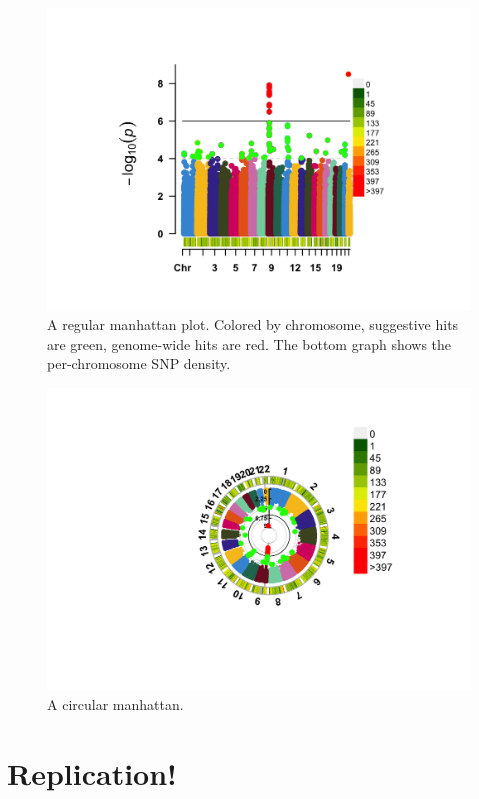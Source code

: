 \documentclass[
]{book}
\begin{document}
\begin{figure}[H]

{\centering \includegraphics[width=0.85\linewidth]{img/_gwas_wtccc/WTCCC1ResultsManhattan-manhattan} 

}

\caption{A regular manhattan plot. Colored by chromosome, suggestive hits are green, genome-wide hits are red. The bottom graph shows the per-chromosome SNP density.}\label{fig:show-wtccc1-graphs-manhattan}
\end{figure}

\begin{figure}[H]

{\centering \includegraphics[width=0.85\linewidth]{img/_gwas_wtccc/WTCCC1ResultsManhattan-circular} 

}

\caption{A circular manhattan.}\label{fig:show-wtccc1-graphs-circular}
\end{figure}

\hypertarget{replication}{%
\section{Replication!}\label{replication}}
\end{document}

